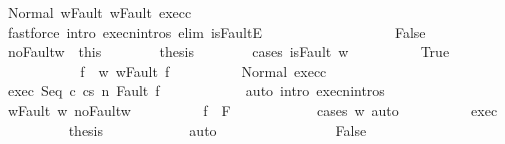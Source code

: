 \begin{isabellebody}
\ Normal\ w{\isacharunderscore}Fault\ w{\isacharprime}{\isacharunderscore}Fault\ exec{\isacharunderscore}c{}\isanewline
\ \ \ \ \ \ \ \ \isamarkupfalse%
\ {\isacharparenleft}fastforce\ intro{\isacharcolon}\ execn{\isachardot}intros\ elim{\isacharcolon}\ isFaultE{\isacharparenright}\ \ \ \ \ \ \isanewline
\ \ \ \ \isamarkupfalse%
\isanewline
\ \ \ \ \ \ \isamarkupfalse%
\ False\isanewline
\ \ \ \ \ \ \isamarkupfalse%
\ noFault{\isacharunderscore}w\ {\isacharequal}\ this\isanewline
\ \ \ \ \ \ \isamarkupfalse%
\ {\isacharquery}thesis\isanewline
\ \ \ \ \ \ \isamarkupfalse%
\ {\isacharparenleft}cases\ {\isachardoublequoteopen}isFault\ w{\isacharprime}{\isachardoublequoteclose}{\isacharparenright}\isanewline
\ \ \ \ \ \ \ \ \isamarkupfalse%
\ True\isanewline
\ \ \ \ \ \ \ \ \isamarkupfalse%
\ \isamarkupfalse%
\ f{\isacharprime}\ \ w{\isacharprime}{\isacharcolon}\ {\isachardoublequoteopen}w{\isacharprime}{\isacharequal}Fault\ f{\isacharprime}{\isachardoublequoteclose}\isacommand{{\isachardot}{\isachardot}}\isamarkupfalse%
\isanewline
\ \ \ \ \ \ \ \ \isamarkupfalse%
\ Normal\ exec{\isacharunderscore}c{}\ \isanewline
\ \ \ \ \ \ \ \ \isamarkupfalse%
\ exec{\isacharcolon}\ {\isachardoublequoteopen}{\isasymGamma}{\isasymturnstile}{\isasymlangle}Seq\ c{}\ c{}{\isacharcomma}s{\isasymrangle}\ {\isacharequal}n{\isasymRightarrow}\ Fault\ f{\isacharprime}{\isachardoublequoteclose}\isanewline
\ \ \ \ \ \ \ \ \ \ \isamarkupfalse%
\ {\isacharparenleft}auto\ intro{\isacharcolon}\ execn{\isachardot}intros{\isacharparenright}\isanewline
\ \ \ \ \ \ \ \ \isamarkupfalse%
\ w{\isacharprime}{\isacharunderscore}Fault\ w{\isacharprime}\ noFault{\isacharunderscore}w\isanewline
\ \ \ \ \ \ \ \ \isamarkupfalse%
\ {\isachardoublequoteopen}f{\isacharprime}\ {\isasymin}\ F{\isachardoublequoteclose}\isanewline
\ \ \ \ \ \ \ \ \ \ \isamarkupfalse%
\ {\isacharparenleft}cases\ w{\isacharparenright}\ auto\isanewline
\ \ \ \ \ \ \ \ \isamarkupfalse%
\ exec\ \isanewline
\ \ \ \ \ \ \ \ \isamarkupfalse%
\ {\isacharquery}thesis\isanewline
\ \ \ \ \ \ \ \ \ \ \isamarkupfalse%
\ auto\isanewline
\ \ \ \ \ \ \isamarkupfalse%
\isanewline
\ \ \ \ \ \ \ \ \isamarkupfalse%
\ False\isanewline
\ \ \ \ \ \ \ \ \isamarkupfalse%

\end{isabellebody}
